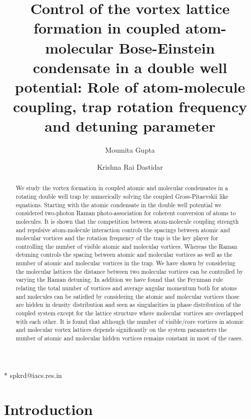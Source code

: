 \documentclass[10pt,a4paper]{article}
\title{Control of the vortex lattice
formation in coupled atom-molecular Bose-Einstein condensate in a
double well potential: Role of atom-molecule coupling, trap
rotation frequency and detuning parameter}
\author[1]{Moumita Gupta}
\author[2,*]{Krishna Rai Dastidar}
\affil[1]{Charuchandra College, Kolkata-700029, INDIA} \affil[2]
\date{}
\begin{document}
\maketitle
* spkrd@iacs.res.in

\begin{abstract}
We study the vortex formation in coupled atomic and molecular
condensates in a rotating double well trap by numerically solving
the coupled Gross-Pitaevskii like equations. Starting with the
atomic condensate in the double well potential we considered
two-photon Raman photo-association for coherent conversion of
atoms to molecules. It is shown that the competition between
atom-molecule coupling strength and repulsive atom-molecule
interaction controls the spacings between atomic and molecular
vortices and the rotation frequency of the trap is the key player
for controlling the number of visible atomic and molecular
vortices. Whereas the Raman detuning controls the spacing between
atomic and molecular vortices as well as the number of atomic and
molecular vortices in the trap. We have shown by considering the molecular 
lattices  the distance between two molecular vortices can be controlled by 
varying the Raman detuning. In addition we have found that the
Feynman rule relating the total number of vortices and average
angular momentum both for atoms and molecules can be satisfied by
considering the atomic and molecular vortices those are hidden in
density distribution and seen as singularities in phase
distribution of the coupled system except for the lattice
structure where molecular vortices are overlapped with each other.
It is found that although the number of visible/core vortices in
atomic and molecular vortex lattices depends significantly on the
system parameters the number of atomic and molecular hidden
vortices remains constant in most of the cases.


\end{abstract}


\section{Introduction}
\end{document}
